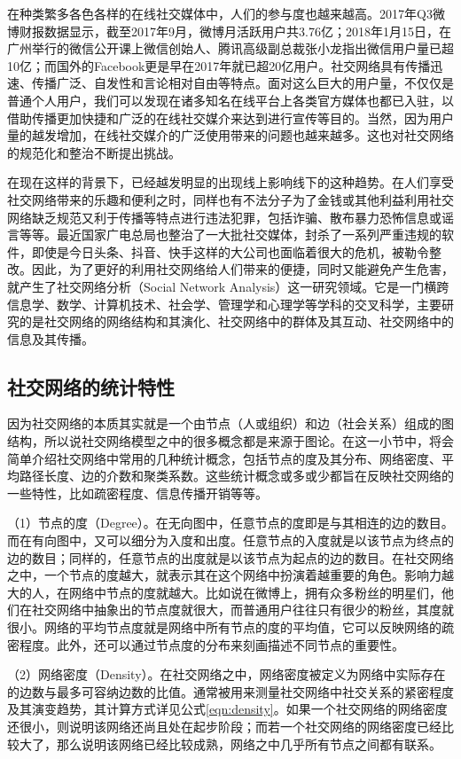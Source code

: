 在种类繁多各色各样的在线社交媒体中，人们的参与度也越来越高。2017年Q3微博财报数据显示，截至2017年9月，微博月活跃用户共3.76亿；2018年1月15日，在广州举行的微信公开课上微信创始人、腾讯高级副总裁张小龙指出微信用户量已超10亿；而国外的Facebook更是早在2017年就已超20亿用户。社交网络具有传播迅速、传播广泛、自发性和言论相对自由等特点。面对这么巨大的用户量，不仅仅是普通个人用户，我们可以发现在诸多知名在线平台上各类官方媒体也都已入驻，以借助传播更加快捷和广泛的在线社交媒介来达到进行宣传等目的。当然，因为用户量的越发增加，在线社交媒介的广泛使用带来的问题也越来越多。这也对社交网络的规范化和整治不断提出挑战。

在现在这样的背景下，已经越发明显的出现线上影响线下的这种趋势。在人们享受社交网络带来的乐趣和便利之时，同样也有不法分子为了金钱或其他利益利用社交网络缺乏规范又利于传播等特点进行违法犯罪，包括诈骗、散布暴力恐怖信息或谣言等等。最近国家广电总局也整治了一大批社交媒体，封杀了一系列严重违规的软件，即使是今日头条、抖音、快手这样的大公司也面临着很大的危机，被勒令整改。因此，为了更好的利用社交网络给人们带来的便捷，同时又能避免产生危害，就产生了社交网络分析（Social Network Analysis）这一研究领域。它是一门横跨信息学、数学、计算机技术、社会学、管理学和心理学等学科的交叉科学，主要研究的是社交网络的网络结构和其演化、社交网络中的群体及其互动、社交网络中的信息及其传播。

\subsection{社交网络的统计特性}

因为社交网络的本质其实就是一个由节点（人或组织）和边（社会关系）组成的图结构，所以说社交网络模型之中的很多概念都是来源于图论。在这一小节中，将会简单介绍社交网络中常用的几种统计概念，包括节点的度及其分布、网络密度、平均路径长度、边的介数和聚类系数。这些统计概念或多或少都旨在反映社交网络的一些特性，比如疏密程度、信息传播开销等等。

（1）节点的度（Degree）。在无向图中，任意节点的度即是与其相连的边的数目。而在有向图中，又可以细分为入度和出度。任意节点的入度就是以该节点为终点的边的数目；同样的，任意节点的出度就是以该节点为起点的边的数目。在社交网络之中，一个节点的度越大，就表示其在这个网络中扮演着越重要的角色。影响力越大的人，在网络中节点的度就越大。比如说在微博上，拥有众多粉丝的明星们，他们在社交网络中抽象出的节点度就很大，而普通用户往往只有很少的粉丝，其度就很小。网络的平均节点度就是网络中所有节点的度的平均值，它可以反映网络的疏密程度。此外，还可以通过节点度的分布来刻画描述不同节点的重要性。

（2）网络密度（Density）。在社交网络之中，网络密度被定义为网络中实际存在的边数与最多可容纳边数的比值。通常被用来测量社交网络中社交关系的紧密程度及其演变趋势，其计算方式详见公式\ref{eqn:density}。如果一个社交网络的网络密度还很小，则说明该网络还尚且处在起步阶段；而若一个社交网络的网络密度已经比较大了，那么说明该网络已经比较成熟，网络之中几乎所有节点之间都有联系。

